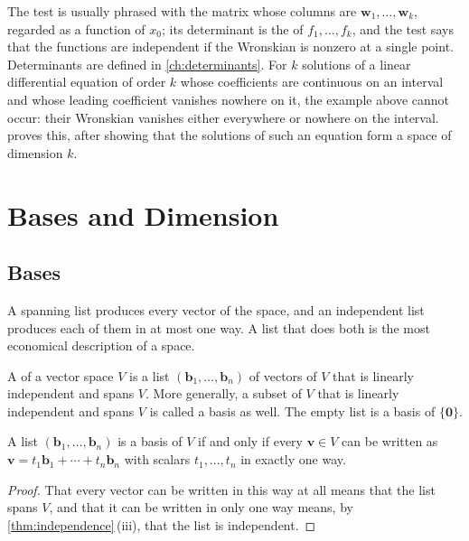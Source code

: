 The test is usually phrased with the matrix whose columns are $\mathbf w_1,\ldots,\mathbf w_k$, regarded as a function of $x_0$; its determinant is the  of $f_1,\ldots,f_k$, and the test says that the functions are independent if the Wronskian is nonzero at a single point. Determinants are defined in \cref{ch:determinants}. For $k$ solutions of a linear differential equation of order $k$ whose coefficients are continuous on an interval and whose leading coefficient vanishes nowhere on it, the example above cannot occur: their Wronskian vanishes either everywhere or nowhere on the interval.  proves this, after showing that the solutions of such an equation form a space of dimension $k$.

\section{Bases and Dimension}
\label{sec:basis-dimension}

\subsection{Bases}

A spanning list produces every vector of the space, and an independent list produces each of them in at most one way. A list that does both is the most economical description of a space.

\begin{definition}[Basis]
\label{def:basis}
A  of a vector space $V$ is a list $(\mathbf b_1,\ldots,\mathbf b_n)$ of vectors of $V$ that is linearly independent and spans $V$. More generally, a subset of $V$ that is linearly independent and spans $V$ is called a basis as well. The empty list is a basis of $\{\mathbf 0\}$.
\end{definition}

\begin{theorem}
\label{thm:basis-unique}
A list $(\mathbf b_1,\ldots,\mathbf b_n)$ is a basis of $V$ if and only if every $\mathbf v\in V$ can be written as $\mathbf v=t_1\mathbf b_1+\cdots+t_n\mathbf b_n$ with scalars $t_1,\ldots,t_n$ in exactly one way.
\end{theorem}

\begin{proof}
That every vector can be written in this way at all means that the list spans $V$, and that it can be written in only one way means, by \cref{thm:independence}\,(iii), that the list is independent.
\end{proof}

